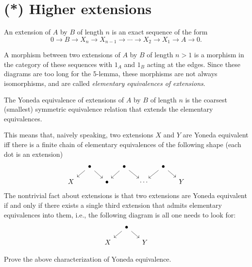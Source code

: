 



\section{(*) Higher extensions}

\begin{defn}
    An extension of $A$ by $B$ of length $n$ is an exact sequence of the form
    \[0\to B\to X_n\to X_{n-1}\to \cdots \to X_2\to X_1\to A\to 0.\]

    A morphism between two extensions of $A$ by $B$ of length $n>1$ is a morphism in the category of these sequences with $1_A$ and $1_B$ acting at the edges. Since these diagrams are too long for the 5-lemma, these morphisms are not always isomorphisms, and are called \emph{elementary equivalences of extensions}.
\end{defn}


\begin{defn}
    The Yoneda equivalence of extensions of $A$ by $B$ of length $n$ is the coarsest (smallest) symmetric equivalence relation that extends the elementary equivalences.
\end{defn}

This means that, naively speaking, two extensions $X$ and $Y$ are Yoneda equivalent iff there is a finite chain of elementary equivalences of the following shape (each dot is an extension)
    \[\begin{tikzcd}[column sep=small,row sep=small]
                 & \bullet\arrow[dl]\arrow[dr]&         & \bullet\arrow[dl]\arrow[dr] &         &  \bullet\arrow[dl]\arrow[dr] \\
        X  &                             &\bullet &                             &\cdots &                             &Y 
    \end{tikzcd}\]
The nontrivial fact about extensions is that two extensions are Yoneda equivalent  if and only if there exists a single third extension that admits elementary equivalences into them, i.e., the following diagram is all one needs to look for:
    \[\begin{tikzcd}[column sep=small,row sep=small]
                 & \bullet\arrow[dl]\arrow[dr]&         \\
        X  &                                & Y
    \end{tikzcd}\]


\begin{xca}
    Prove the above characterization of Yoneda equivalence.
\end{xca}

